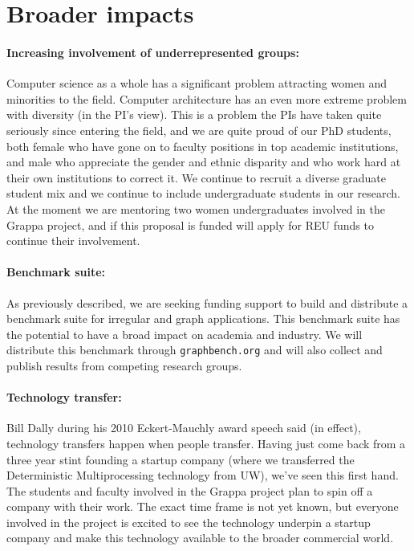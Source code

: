 \section{Broader impacts}

\paragraph{Increasing involvement of underrepresented groups:} Computer science as a whole has a significant problem attracting women and minorities to the field.  Computer architecture has an even more extreme problem with diversity (in the PI's view).  This is a problem the PIs have taken quite seriously since entering the field, and we are quite proud of our PhD students, both female who have gone on to faculty positions in top academic institutions, and male who appreciate the gender and ethnic disparity and who work hard at their own institutions to correct it.  We continue to recruit a diverse graduate student mix and we continue to include undergraduate students in our research.  At the moment we are mentoring two women undergraduates involved in the Grappa project, and if this proposal is funded will apply for REU funds to continue their involvement.

\paragraph{Benchmark suite:} As previously described, we are seeking funding support to build and distribute a benchmark suite for irregular and graph applications.  This benchmark suite has the potential to have a broad impact on academia and industry.  We will distribute this benchmark through \texttt{graphbench.org} and will also collect and publish results from competing research groups.

\paragraph{Technology transfer:} Bill Dally during his 2010 Eckert-Mauchly award speech said (in effect), technology transfers happen when people transfer.  Having just come back from a three year stint founding a startup company (where we transferred the Deterministic Multiprocessing technology from UW), we've seen this first hand.  The students and faculty involved in the Grappa project plan to spin off a company with their work.  The exact time frame is not yet known, but everyone involved in the project is excited to see the technology underpin a startup company and make this technology available to the broader commercial world.

